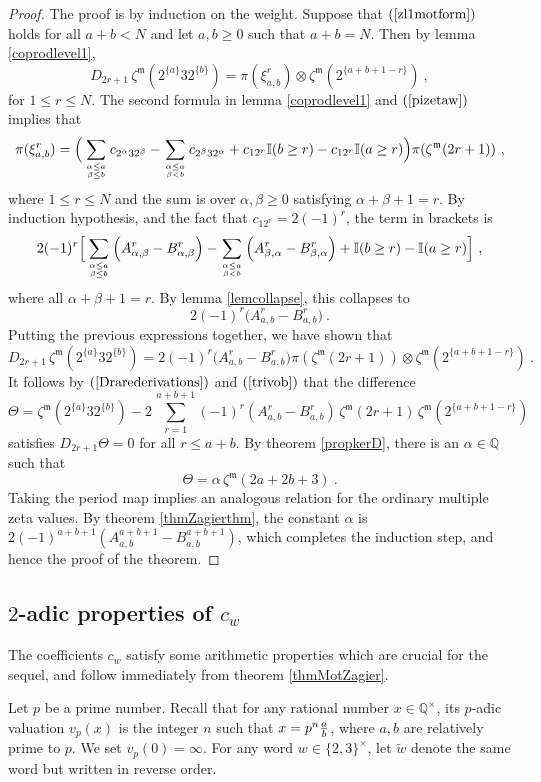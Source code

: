 \documentclass[10pt]{amsart}
\theoremstyle{definition}
\theoremstyle{remark}
\numberwithin{equation}{section}
\newcommand{\zetam}{\zeta^{ \mathfrak{m}}}
\newcommand{\Q}{\mathbb Q}
\begin{document}
\begin{proof} The proof is by induction on the weight. Suppose that $(\ref{zl1motform})$ holds for all $a+b <N$ and let $a,b\geq 0$ such that $a+b=N$. Then  by lemma \ref{coprodlevel1},
$$ D_{2r+1} \, \zetam(2^{\{a\}}32^{\{b\}}) =  \pi(\xi^r_{a,b})  \otimes \zetam(2^{\{a+b+1-r\}}) \ ,$$
for $1\leq r\leq N$. 
The second formula in lemma \ref{coprodlevel1} and $(\ref{pizetaw})$ implies that 
$$\pi(\xi^r_{a,b})  =  \Big( \sum_{{\alpha\leq a \atop \beta \leq b}} c_{2^\alpha 32^\beta}  - \sum_{\alpha \leq a \atop \beta< b}c_{2^{\beta}32^{\alpha}} +  c_{12^r} \mathbb{I}(b\geq r) -  c_{12^r} \mathbb{I}(a\geq r)  \Big)  \pi(\zetam(2r+1))\ , $$
where   $1\leq r\leq N $ and   the sum is over $\alpha, \beta\geq 0$ satisfying  $\alpha+ \beta+1=r$. 
By induction hypothesis, and
the fact that $c_{12^r}=2(-1)^r$,  the term in brackets is 
$$ 
2 (-1)^r\Big[ \sum_{{\alpha\leq a \atop \beta \leq b}} \Big(A^{r}_{\alpha,\beta} -B^{r}_{\alpha,\beta}\Big)  - \sum_{\alpha \leq a \atop \beta< b}\Big(A^{r}_{\beta,\alpha}-B^{r}_{\beta,\alpha}\Big) +   \mathbb{I}(b\geq r) -  \mathbb{I}(a\geq r) \Big] \ ,$$
where all $\alpha+\beta+1=r$. By lemma \ref{lemcollapse}, this  collapses to
 $$ 2 (-1)^r \big(  A^{r}_{a,b}- B^{r}_{a,b}  \big)\ .  $$
 Putting the previous expressions together, we have shown that 
 $$ D_{2r+1} \, \zetam(2^{\{a\}}32^{\{b\}}) =    2(-1)^r \big(  A^{r}_{a,b}- B^{r}_{a,b}  \big)   \pi(\zetam(2r+1)) \otimes \zetam(2^{\{a+b+1-r\}})\ . $$
It follows by $(\ref{Drarederivations})$ and  $(\ref{trivob})$ that the difference 
$$\Theta=\zetam(2^{\{a\}}32^{\{b\}})-  2\, \sum_{r=1}^{a+b+1} (-1)^r (A^r_{a,b}-B^r_{a,b})\, \zetam(2r+1)\,  \zetam(2^{\{a+b+1-r\}})  $$
satisfies $D_{2r+1}\Theta=0$ for all $r\leq a+b$.  By theorem \ref{propkerD}, there is an $\alpha\in \Q$ such that
$$\Theta = \alpha \, \zetam(2a+2b+3)\ .$$
Taking the period map implies  an analogous relation for the ordinary multiple zeta values. By theorem \ref{thmZagierthm}, the constant $\alpha$ is $2(-1)^{a+b+1}(A^{a+b+1}_{a,b}-B^{a+b+1}_{a,b})$, which completes the induction step, and hence the proof of the theorem.
\end{proof}
\subsection{$2$-adic properties of $c_w$} The coefficients $c_w$ satisfy some arithmetic properties which are crucial for the sequel, and follow  immediately from theorem  \ref{thmMotZagier}. 
 
 Let $p$ be a prime number. Recall that for any rational number $x\in \Q^{\times}$, its  $p$-adic valuation $v_p(x)$ is the integer $n$ such that
$x=p^n {a \over b}$, where $a,b$ are relatively prime to $p$. We set $v_p(0)=\infty$. For any word $w\in \{2,3\}^\times$, let $\widetilde{w}$ denote the same word but written in reverse order. 
\end{document}

